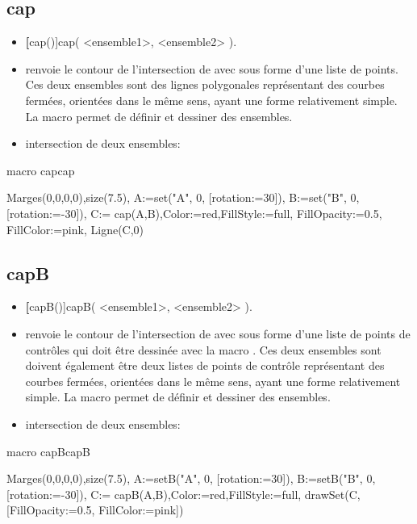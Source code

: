 \subsection{cap}
\begin{itemize}
 \item \util \textbf[cap()]{cap( <ensemble1>, <ensemble2> )}.
 \item \desc renvoie le contour de l'intersection de  avec  sous forme d'une liste de points. Ces deux ensembles sont des lignes polygonales représentant des courbes fermées, orientées dans le même sens, ayant une forme relativement simple. La macro  permet de définir et dessiner des ensembles.
 \item \exem intersection de deux ensembles:
\end{itemize}


\begin{demo}{macro cap}{cap}
\begin{texgraph}[name=cap]
Marges(0,0,0,0),size(7.5),
A:=set("A", 0, [rotation:=30]), 
B:=set("B", 0, [rotation:=-30]),
C:= cap(A,B),Color:=red,FillStyle:=full, 
FillOpacity:=0.5, FillColor:=pink,
Ligne(C,0)
\end{texgraph}
\end{demo}

\subsection{capB}\label{maccapB}
\begin{itemize}
 \item \util \textbf[capB()]{capB( <ensemble1>, <ensemble2> )}.
 \item \desc renvoie le contour de l'intersection de  avec  sous forme d'une liste de points de contrôles qui doit être dessinée avec la macro . Ces deux ensembles sont doivent également être deux listes de points de contrôle représentant des courbes fermées, orientées dans le même sens, ayant une forme relativement simple. La macro  permet de définir et dessiner des ensembles.
 \item \exem intersection de deux ensembles:
\end{itemize}


\begin{demo}{macro capB}{capB}
\begin{texgraph}[name=capB]
Marges(0,0,0,0),size(7.5),
A:=setB("A", 0, [rotation:=30]), 
B:=setB("B", 0, [rotation:=-30]),
C:= capB(A,B),Color:=red,FillStyle:=full, 
drawSet(C, [FillOpacity:=0.5, FillColor:=pink])
\end{texgraph}
\end{demo}


